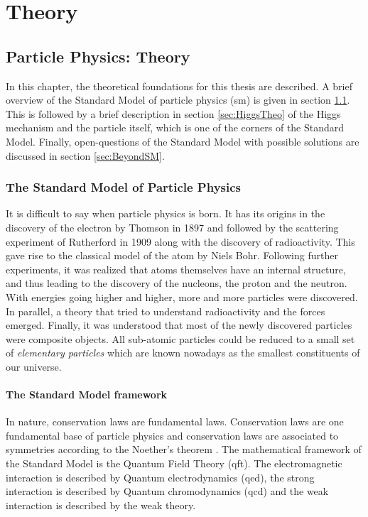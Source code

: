 \part{Theory}

\chapter{Particle Physics: Theory}
\label{chap:Theory}

In this chapter, the theoretical foundations for this thesis are described. A brief overview of the Standard Model of particle physics (\acrshort{sm}) is given in section \ref{sec:SM}. This is followed by a brief description in section \ref{sec:HiggsTheo} of the Higgs mechanism and the particle itself, which is one of the corners of the Standard Model. Finally, open-questions of the Standard Model with possible solutions are discussed in section \ref{sec:BeyondSM}.

\section{The Standard Model of Particle Physics}
\label{sec:SM}

It is difficult to say when particle physics is born. It has its origins in the discovery of the electron by Thomson \cite{JJThomson:1897} in 1897 and followed by the scattering experiment of Rutherford \cite{Rutherford:1911} in 1909 along with the discovery of radioactivity. This gave rise to the classical model of the atom by Niels Bohr. Following further experiments, it was realized that atoms themselves have an internal structure, and thus leading to the discovery of the nucleons, the proton and the neutron. With energies going higher and higher, more and more particles were discovered. In parallel, a theory that tried to understand radioactivity and the forces emerged. Finally, it was understood that most of the newly discovered particles were composite objects. All sub-atomic particles could be reduced to a small set of \textit{elementary particles} which are known nowadays as the smallest constituents of our universe.

\subsection{The Standard Model framework}

In nature, conservation laws are fundamental laws. Conservation laws are one fundamental base of particle physics and conservation laws are associated to symmetries according to the Noether's theorem \cite{ENoether1971}. The mathematical framework of the Standard Model is the Quantum Field Theory (\acrshort{qft}). The electromagnetic interaction is described by Quantum electrodynamics (\acrshort{qed}), the strong interaction is described by Quantum chromodynamics (\acrshort{qcd}) and the weak interaction is described by the weak theory.

